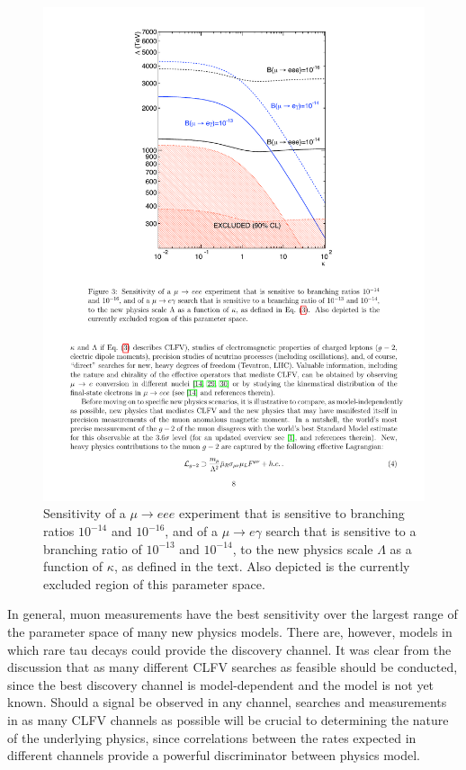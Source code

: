 \documentclass{tcibook}
\begin{document}
\begin{figure}[ht]
\begin{minipage}[b]{0.48\linewidth}
    \includegraphics[trim = 45mm 130mm 50mm 10mm, clip, width=\linewidth]{Page8.pdf}
  \caption{{Sensitivity of a $\mu \to eee$ experiment that is sensitive to branching ratios $10^{−14}$ and 
$10^{−16}$, and of a $\mu \to e \gamma$ search that is sensitive to a branching ratio of $10^{−13}$ and $10^{−14}$, to the new 
physics scale $\Lambda$ as a function of $\kappa$, as defined in the text.  Also depicted is the
currently excluded region of this parameter space.
}}
  \label{fig:cl:p8}
\end{minipage}
\end{figure}

In general, muon measurements have the best
sensitivity over the largest range of the parameter space of many new
physics models. There are, however, models
in which  rare tau decays could provide the discovery
channel. It was clear from the discussion that as many different
CLFV searches as feasible should be conducted, since the best discovery
channel is model-dependent and the model is not yet known.  Should a
signal be observed in any channel, searches and measurements in as
many CLFV channels as possible will be crucial to determining the nature
of the underlying physics, since correlations between the rates
expected in different channels provide a powerful discriminator between
physics model.
\end{document}
